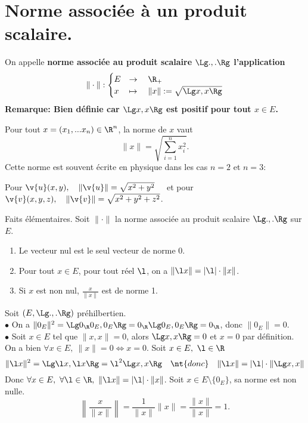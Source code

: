\documentclass[11pt]{article}
\begin{document}
\section{Norme associée à un produit scalaire.}

\begin{defi}{}{}
    On appelle \bf{norme associée au produit scalaire} $\Lg.,.\Rg$ l'application
    \begin{equation*}
        \|\cdot\|:\begin{cases}E&\to\quad\R_+\\x&\mapsto\quad\|x\|:=\sqrt{\Lg x,x\Rg}\end{cases}
    \end{equation*}
    \bf{Remarque:} Bien définie car $\Lg x,x \Rg$ est positif pour tout $x\in E$.
\end{defi}

\begin{ex}{}{}
    Pour tout $x=(x_1,...x_n)\in\R^n$, la norme de $x$ vaut
    \begin{equation*}
        \|x\|=\sqrt{\sum_{i=1}^nx_i^2}.
    \end{equation*}
    Cette norme est souvent écrite en physique dans les cas $n=2$ et $n=3$:
    \begin{center}
        Pour $\v{u}(x,y), \quad \|\v{u}\|=\sqrt{x^2+y^2}\quad$ et pour $\v{v}(x,y,z), \quad \|\v{v}\|=\sqrt{x^2+y^2+z^2}$.
    \end{center}
\end{ex}

\begin{prop}{Faits élémentaires.}{}
    Soit $\|\cdot\|$ la norme associée au produit scalaire $\Lg.,.\Rg$ sur $E$.
    \begin{enumerate}[topsep=0pt,itemsep=-0.9 ex]
        \item Le vecteur nul est le seul vecteur de norme 0.
        \item Pour tout $x\in E$, pour tout réel $\l$, on a $\|\l x\| = |\l|\cdot\|x\|$.
        \item Si $x$ est non nul, $\frac{x}{\|x\|}$ est de norme 1.
    \end{enumerate}
    \tcblower
    Soit $(E,\Lg.,.\Rg)$ préhilbertien.\\
     $\bullet$ On a $\|0_E\|^2=\Lg0_\R0_E,0_E\Rg=0_\R\Lg0_E,0_E\Rg=0_{\R}$, donc $\|0_E\|=0$.\\
    $\bullet$ Soit $x\in E$ tel que $\| x,x\|=0$, alors $\Lg x,x \Rg = 0$ et $x=0$ par définition.\\
    On a bien $\forall x \in E, ~ \|x\|=0 \iff x=0$.\n
     Soit $x\in E, ~ \l \in \R$
    \begin{equation*}
        \|\l x\|^2 = \Lg \l x, \l x \Rg = \l^2\Lg x, x\Rg \quad \nt{donc} \quad \|\l x\| = |\l|\cdot\|\Lg x,x \|
    \end{equation*}
    Donc $\forall x \in E, ~ \forall \l \in \R, ~ \|\l x\|=|\l|\cdot\|x\|$.\n
     Soit $x\in E\setminus\{0_E\}$, sa norme est non nulle.
    \begin{equation*}
        \left\|\frac{x}{\|x\|}\right\|=\frac{1}{\|x\|}\|x\|=\frac{\|x\|}{\|x\|}=1.
    \end{equation*}
\end{prop}
\end{document}
